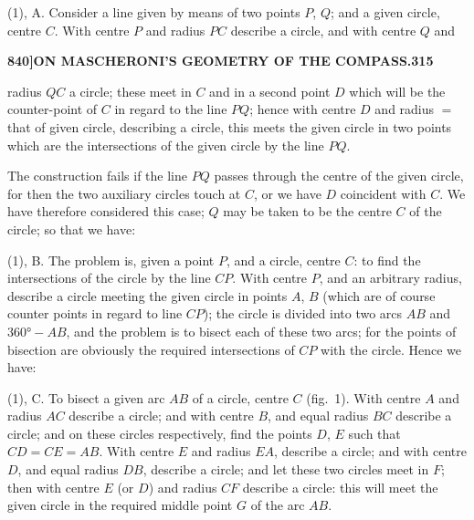 \documentclass[12pt,a4paper]{article}
\theoremstyle{definition}
\begin{document}
(1), A. Consider a line given by means of two points $P$, $Q$; and a given circle, centre $C$. With centre $P$ and radius $PC$ describe a circle, and with centre $Q$ and

\newpage
\setcounter{page}{315}

\noindent\textbf{840]}\hfill\textbf{ON MASCHERONI'S GEOMETRY OF THE COMPASS.}\hfill\textbf{315}

\bigskip

\noindent radius $QC$ a circle; these meet in $C$ and in a second point $D$ which will be the counter-point of $C$ in regard to the line $PQ$; hence with centre $D$ and radius $=$ that of given circle, describing a circle, this meets the given circle in two points which are the intersections of the given circle by the line $PQ$.

The construction fails if the line $PQ$ passes through the centre of the given circle, for then the two auxiliary circles touch at $C$, or we have $D$ coincident with $C$. We have therefore considered this case; $Q$ may be taken to be the centre $C$ of the circle; so that we have:

(1), B. The problem is, given a point $P$, and a circle, centre $C$: to find the intersections of the circle by the line $CP$. With centre $P$, and an arbitrary radius, describe a circle meeting the given circle in points $A$, $B$ (which are of course counter points in regard to line $CP$); the circle is divided into two arcs $AB$ and $360° - AB$, and the problem is to bisect each of these two arcs; for the points of bisection are obviously the required intersections of $CP$ with the circle. Hence we have:

(1), C. To bisect a given arc $AB$ of a circle, centre $C$ (fig.\ 1). With centre $A$ and radius $AC$ describe a circle; and with centre $B$, and equal radius $BC$ describe a circle; and on these circles respectively, find the points $D$, $E$ such that $CD = CE = AB$. With centre $E$ and radius $EA$, describe a circle; and with centre $D$, and equal radius $DB$, describe a circle; and let these two circles meet in $F$; then with centre $E$ (or $D$) and radius $CF$ describe a circle: this will meet the given circle in the required middle point $G$ of the arc $AB$.

\begin{figure}[H]
\centering
{}
\end{figure}
\end{document}
